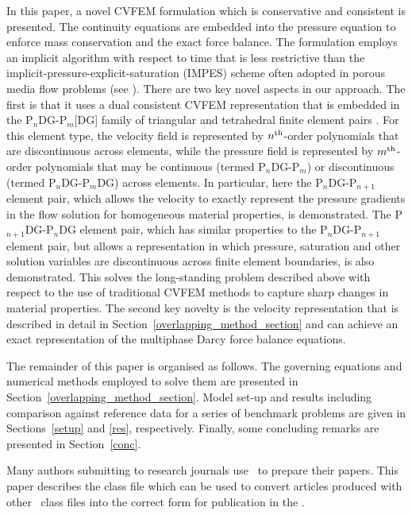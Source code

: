 \documentclass[times]{fldauth}
\newcommand{\PN}[2][error]{P$_{#1}$DG-P$_{#2}$}
\newcommand{\PNDG}[2][error]{P$_{#1}$DG-P$_{#2}$DG}
\begin{document}
In this paper, a novel CVFEM formulation which is conservative and consistent is presented. The continuity equations are embedded into the pressure equation to enforce mass conservation and the exact force balance. The formulation employs an implicit algorithm with respect to time that is less restrictive than the implicit-pressure-explicit-saturation (IMPES) scheme often adopted in porous media flow problems (see \cite{aziz_1986,geiger_2004}). There are two key novel aspects in our approach. The first is that it uses a dual consistent CVFEM representation that is embedded in the \PN[n]{m}[DG] family of triangular and tetrahedral finite element pairs \cite{kaisu}. For this element type, the velocity field is represented by $n^{\rm th}$-order polynomials that are discontinuous across elements, while the pressure field is represented by $m^{\rm th}$-order polynomials that may be continuous (termed P$_n$DG-P$_m$) or discontinuous (termed P$_n$DG-P$_m$DG) across elements. In particular, here the P$_n$DG-P$_{n+1}$ element pair, which allows the velocity to exactly represent the pressure gradients in the flow solution for homogeneous material properties, is demonstrated. The \PNDG[n+1]{n} element pair, which has similar properties to the \PN[n]{n+1} element pair, but allows a representation in which pressure, saturation and other solution variables are discontinuous across finite element boundaries, is also demonstrated.  This solves the long-standing problem described above with respect to the use of traditional CVFEM methods to capture sharp changes in material properties. The second key novelty is the velocity representation that is described in detail in Section~\ref{overlapping_method_section} and can achieve an exact representation of the multiphase Darcy force balance equations.

The remainder of this paper is organised as follows. The governing equations and numerical methods employed to solve them are presented in Section~\ref{overlapping_method_section}. Model set-up and results including comparison against reference data for a series of benchmark problems are given in Sections~\ref{setup} and \ref{res}, respectively. Finally, some concluding remarks are presented in Section~\ref{conc}.

\bigskip











Many authors submitting to research journals use \LaTeXe\ to
prepare their papers. This paper describes the
\textsf{\journalclass} class file which can be used to convert
articles produced with other \LaTeXe\ class files into the correct
form for publication in the \emph{\journalnamelc}.
\end{document}
